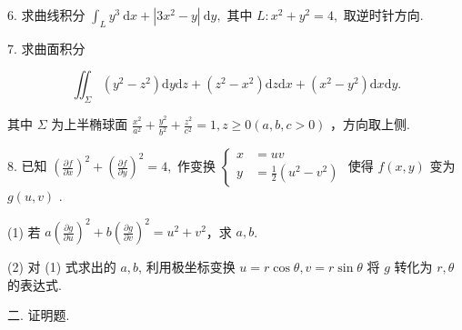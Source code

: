 \documentclass{examcollection}
\renewcommand{\displayformula}[1]{\[#1\]}
\begin{document}
{\begin{minipage}{\textwidth}
6. 求曲线积分 $\int_{L} y^{3} \mathrm{~d} x + |3x^{2} - y| \mathrm{~d} y,$ 其中 $L: x^{2} + y^{2} = 4,$ 取逆时针方向.\par
7. 求曲面积分\par
\displayformula{\iint_ {\Sigma} \left(y ^ {2} - z ^ {2}\right) \mathrm{d} y \mathrm{d} z + \left(z ^ {2} - x ^ {2}\right) \mathrm{d} z \mathrm{d} x + \left(x ^ {2} - y ^ {2}\right) \mathrm{d} x \mathrm{d} y.}\par
其中 $\Sigma$ 为上半椭球面 $\frac{x^2}{a^2} +\frac{y^2}{b^2} +\frac{z^2}{c^2} = 1,z\geq 0(a,b,c > 0)$ ，方向取上侧.\par
8. 已知  $\left(\frac{\partial f}{\partial x}\right)^{2} + \left(\frac{\partial f}{\partial y}\right)^{2} = 4,$  作变换  $\left\{\begin{aligned}x &= uv \\ y &= \frac{1}{2}(u^{2} - v^{2})\end{aligned}\right.$  使得  $f(x,y)$  变为  $g(u,v)$ .\par
(1) 若 $a\left(\frac{\partial g}{\partial u}\right)^2 + b\left(\frac{\partial g}{\partial v}\right)^2 = u^2 + v^2$，求 $a, b$.\par
(2) 对 (1) 式求出的 $a, b$, 利用极坐标变换 $u = r \cos \theta, v = r \sin \theta$ 将 $g$ 转化为 $r, \theta$ 的表达式.\par
二. 证明题.\par
\end{minipage}}
\ifdim\dimexpr\ht\proofbox+\dp\proofbox\relax>\textheight
\noindent\resizebox{!}{\textheight}{\usebox{\proofbox}}\else\noindent\usebox{\proofbox}\fi\clearpage
\end{document}

